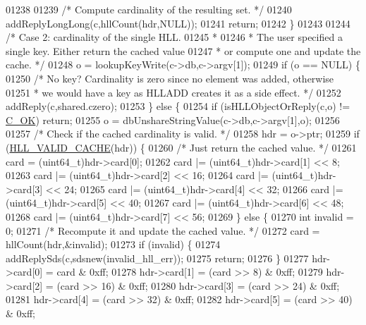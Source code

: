 \begin{DoxyCode}
{{01238 
01239         \textcolor{comment}{/* Compute cardinality of the resulting set. */}
01240         addReplyLongLong(c,hllCount(hdr,NULL));
01241         \textcolor{keywordflow}{return};
01242     \}
01243 
01244     \textcolor{comment}{/* Case 2: cardinality of the single HLL.}
01245 \textcolor{comment}{     *}
01246 \textcolor{comment}{     * The user specified a single key. Either return the cached value}
01247 \textcolor{comment}{     * or compute one and update the cache. */}
01248     o = lookupKeyWrite(c->db,c->argv[1]);
01249     \textcolor{keywordflow}{if} (o == NULL) \{
01250         \textcolor{comment}{/* No key? Cardinality is zero since no element was added, otherwise}
01251 \textcolor{comment}{         * we would have a key as HLLADD creates it as a side effect. */}
01252         addReply(c,shared.czero);
01253     \} \textcolor{keywordflow}{else} \{
01254         \textcolor{keywordflow}{if} (isHLLObjectOrReply(c,o) != \hyperlink{server_8h_a303769ef1065076e68731584e758d3e1}{C\_OK}) \textcolor{keywordflow}{return};
01255         o = dbUnshareStringValue(c->db,c->argv[1],o);
01256 
01257         \textcolor{comment}{/* Check if the cached cardinality is valid. */}
01258         hdr = o->ptr;
01259         \textcolor{keywordflow}{if} (\hyperlink{hyperloglog_8c_af43935d3efe680c096b65a63aa8eeb0c}{HLL\_VALID\_CACHE}(hdr)) \{
01260             \textcolor{comment}{/* Just return the cached value. */}
01261             card = (uint64\_t)hdr->card[0];
01262             card |= (uint64\_t)hdr->card[1] << 8;
01263             card |= (uint64\_t)hdr->card[2] << 16;
01264             card |= (uint64\_t)hdr->card[3] << 24;
01265             card |= (uint64\_t)hdr->card[4] << 32;
01266             card |= (uint64\_t)hdr->card[5] << 40;
01267             card |= (uint64\_t)hdr->card[6] << 48;
01268             card |= (uint64\_t)hdr->card[7] << 56;
01269         \} \textcolor{keywordflow}{else} \{
01270             \textcolor{keywordtype}{int} invalid = 0;
01271             \textcolor{comment}{/* Recompute it and update the cached value. */}
01272             card = hllCount(hdr,&invalid);
01273             \textcolor{keywordflow}{if} (invalid) \{
01274                 addReplySds(c,sdsnew(invalid\_hll\_err));
01275                 \textcolor{keywordflow}{return};
01276             \}
01277             hdr->card[0] = card & 0xff;
01278             hdr->card[1] = (card >> 8) & 0xff;
01279             hdr->card[2] = (card >> 16) & 0xff;
01280             hdr->card[3] = (card >> 24) & 0xff;
01281             hdr->card[4] = (card >> 32) & 0xff;
01282             hdr->card[5] = (card >> 40) & 0xff;
}}
\end{DoxyCode}
